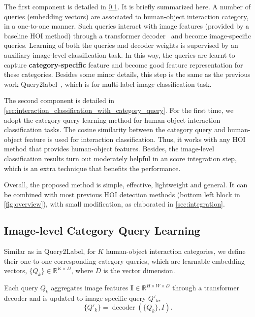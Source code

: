 \documentclass[10pt,twocolumn,letterpaper]{article}
\begin{document}
The first component is detailed in \cref{sec:category_query_learning}. It is briefly summarized here. A number of queries (embedding vectors) are associated to human-object interaction category, in a one-to-one manner. Such queries interact with image features (provided by a baseline HOI method) through a transformer decoder~\cite{vaswani2017attention} and become image-specific queries. Learning of both the queries and decoder weights is supervised by an auxiliary image-level classification task. In this way, the queries are learnt to capture \textbf{category-specific} feature and become good feature representation for these categories. Besides some minor details, this step is the same as the previous work Query2label~\cite{liu2021query2label}, which is for multi-label image classification task.



The second component is detailed in \cref{sec:interaction_classification_with_category_query}. For the first time, we adopt the category query learning method for human-object interaction classification tasks. The cosine similarity between the category query and human-object feature is used for interaction classification. Thus, it works with any HOI method that provides human-object features. Besides, the image-level classification results turn out moderately helpful in an score integration step, which is an extra technique that benefits the performance.

Overall, the proposed method is simple, effective, lightweight and general. It can be combined with most previous HOI detection methods (bottom left block in \cref{fig:overview}), with small modification, as elaborated in \cref{sec:integration}.

\subsection{Image-level Category Query Learning}
\label{sec:category_query_learning}
Similar as in Query2Label\cite{liu2021query2label}, for $K$ human-object interaction categories, we define their one-to-one corresponding category queries, which are learnable embedding vectors, $\{Q_{k}\} \in \mathbb{R}^{K \times D}$, where $D$ is the vector dimension. 

Each query $Q_{k}$ aggregates image features $\mathbf{I} \in \mathbb{R}^{H \times W \times D}$ through a transformer decoder and is updated to image specific query ${Q'_{k}}$,
\begin{equation}
    \{Q'_{k}\} = \operatorname{decoder}(\{Q_{k}\}, I). 
    \label{eq.feat_extraction}
\end{equation}
\end{document}
